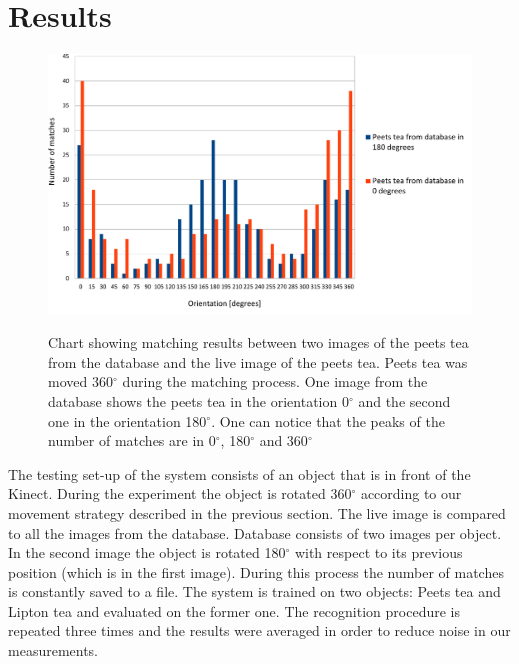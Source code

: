 \section{Results}

\begin{figure}

\includegraphics[width=1.3\columnwidth]{figures/print2.pdf}\\


\caption{Chart showing matching results between two images of the peets tea from the database and the live image of the peets tea. Peets tea was moved 360$^\circ$ during the matching process. One image from the database shows the peets tea in the orientation 0$^\circ$ and the second one in the orientation 180$^\circ$. One can notice that the peaks of the number of matches are in 0$^\circ$, 180$^\circ$ and 360$^\circ$}
\label{fig:recognition-results}
\end{figure}
The testing set-up of the system consists of an object that is in front of the Kinect. During the experiment the object is rotated 360$^\circ$ according to our movement strategy described in the previous section. The live image is compared to all the images from the database. Database consists of two images per object. In the second image the object is rotated 180$^\circ$ with respect to its previous position (which is in the first image). During this process the number of matches is constantly saved to a file. The system is trained on two objects: Peets tea and Lipton tea and evaluated on the former one. The recognition procedure is repeated three times and the results were averaged in order to reduce noise in our measurements. 

